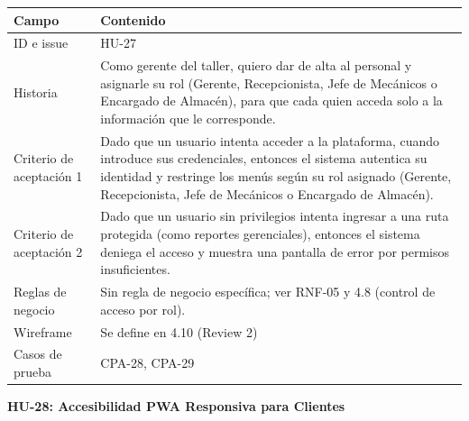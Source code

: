 {\def\LTcaptype{none} %
\begin{longtable}[]{@{}
  >{\raggedright\arraybackslash}p{}
  >{\raggedright\arraybackslash}p{}@{}}
\toprule\noalign{}
\begin{minipage}[b]{\linewidth}\raggedright
\textbf{Campo}
\end{minipage} & \begin{minipage}[b]{\linewidth}\raggedright
\textbf{Contenido}
\end{minipage} \\
\midrule\noalign{}
\endhead
\bottomrule\noalign{}
\endlastfoot
ID e issue & HU-27 \\
Historia & Como gerente del taller, quiero dar de alta al personal y
asignarle su rol (Gerente, Recepcionista, Jefe de Mecánicos o Encargado
de Almacén), para que cada quien acceda solo a la información que le
corresponde. \\
Criterio de aceptación 1 & Dado que un usuario intenta acceder a la
plataforma, cuando introduce sus credenciales, entonces el sistema
autentica su identidad y restringe los menús según su rol asignado
(Gerente, Recepcionista, Jefe de Mecánicos o Encargado de Almacén). \\
Criterio de aceptación 2 & Dado que un usuario sin privilegios intenta
ingresar a una ruta protegida (como reportes gerenciales), entonces el
sistema deniega el acceso y muestra una pantalla de error por permisos
insuficientes. \\
Reglas de negocio & Sin regla de negocio específica; ver RNF-05 y 4.8
(control de acceso por rol). \\
Wireframe & Se define en 4.10 (Review 2) \\
Casos de prueba & CPA-28, CPA-29 \\
\end{longtable}
}

\textbf{HU-28: Accesibilidad PWA Responsiva para Clientes}

